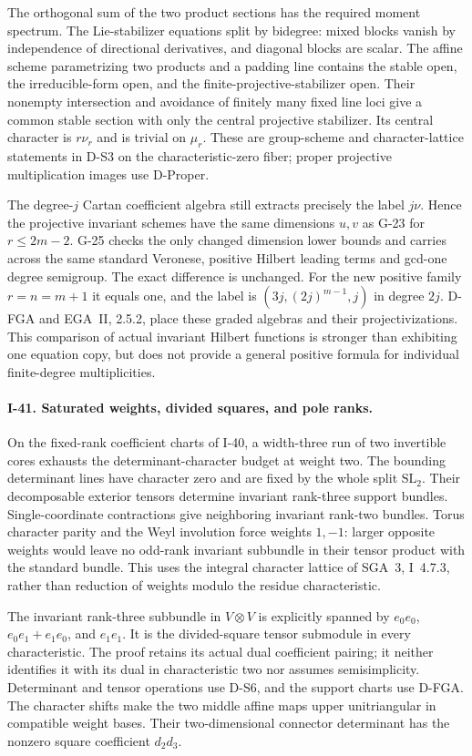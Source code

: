 The orthogonal sum of the two product sections has the required
moment spectrum. The Lie-stabilizer equations split by bidegree:
mixed blocks vanish by independence of directional derivatives,
and diagonal blocks are scalar. The affine scheme parametrizing
two products and a padding line contains the stable open, the
irreducible-form open, and the finite-projective-stabilizer open.
Their nonempty intersection and avoidance of finitely many fixed
line loci give a common stable section with only the central
projective stabilizer. Its central character is $r\nu_r$ and
is trivial on $\mu_r$. These are group-scheme and character-lattice
statements in D-S3 on the characteristic-zero fiber; proper
projective multiplication images use D-Proper.

The degree-$j$ Cartan coefficient algebra still extracts precisely
the label $j\nu$. Hence the projective invariant schemes have
the same dimensions $u,v$ as G-23 for $r\le2m-2$. G-25 checks
the only changed dimension lower bounds and carries across the
same standard Veronese, positive Hilbert leading terms and
gcd-one degree semigroup. The exact difference is unchanged.
For the new positive family $r=n=m+1$ it equals one, and the
label is $(3j,(2j)^{m-1},j)$ in degree $2j$.
D-FGA and EGA~II, 2.5.2, place these graded algebras and their
projectivizations. This comparison of actual invariant Hilbert
functions is stronger than exhibiting one equation copy, but
does not provide a general positive formula for individual
finite-degree multiplicities.

\paragraph{I-41. Saturated weights, divided squares, and pole ranks.}
On the fixed-rank coefficient charts of I-40, a width-three run
of two invertible cores exhausts the determinant-character budget
at weight two. The bounding determinant lines have character zero
and are fixed by the whole split $\mathrm{SL}_2$. Their decomposable
exterior tensors determine invariant rank-three support bundles.
Single-coordinate contractions give neighboring invariant
rank-two bundles. Torus character parity and the Weyl involution
force weights $1,-1$: larger opposite weights would leave no
odd-rank invariant subbundle in their tensor product with the
standard bundle. This uses the integral character lattice of
SGA~3, I~4.7.3, rather than reduction of weights modulo the
residue characteristic.

The invariant rank-three subbundle in $V\otimes V$ is explicitly
spanned by $e_0e_0$, $e_0e_1+e_1e_0$, and $e_1e_1$.
It is the divided-square tensor submodule in every characteristic.
The proof retains its actual dual coefficient pairing; it neither
identifies it with its dual in characteristic two nor assumes
semisimplicity. Determinant and tensor operations use D-S6,
and the support charts use D-FGA. The character shifts make
the two middle affine maps upper unitriangular in compatible
weight bases. Their two-dimensional connector determinant has
the nonzero square coefficient $d_2d_3$.

